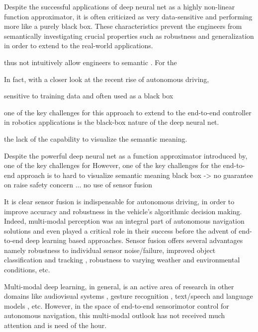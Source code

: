 \documentclass[../thesis.tex]{subfiles}
\begin{document}
Despite the successful applications of deep neural net as a highly non-linear function approximator, it is often criticized as very data-sensitive and performing more like a purely black box. These characteristics prevent the engineers from semantically investigating crucial properties such as robustness and generalization in order to extend 
to the real-world applications.


thus not intuitively allow engineers to semantic 
. For the 

In fact, with a closer look at the recent rise of autonomous driving, 

sensitive to training data and often used as a black box 

one of the key challenges for this approach to extend to the end-to-end controller in robotics applications is the black-box nature of the deep neural net.

the lack of the capability to visualize the semantic meaning. 

Despite the powerful deep neural net as a function approximator introduced by, one of the key challenges for 
However, one of the key challenges for the end-to-end approach is to 
hard to visualize semantic meaning 
black box -> no guarantee on 
raise safety concern ... 
no use of sensor fusion










It is clear sensor fusion is indispensable for autonomous driving, in order to improve accuracy and robustness in the vehicle's algorithmic decision making. Indeed, multi-modal perception was an integral part of autonomous navigation solutions and even played a critical role in their success \cite{multimodaltartan} before the advent of end-to-end deep learning based approaches. Sensor fusion offers several advantages namely robustness to individual sensor noise/failure, improved object classification and tracking \cite{elfring2016multisensor, cho2014multi, darms2008classification}, robustness to varying weather and environmental conditions, etc. 

Multi-modal deep learning, in general, is an active area of research in other domains like audiovisual systems \cite{ngmultimodal}, gesture recognition \cite{moddrop}, text/speech and language models \cite{languagemultimodal,srivastava2012multimodal}, etc. However, in the space of end-to-end sensorimotor control for autonomous navigation, this multi-modal outlook has not received much attention and is need of the hour.
\end{document}
